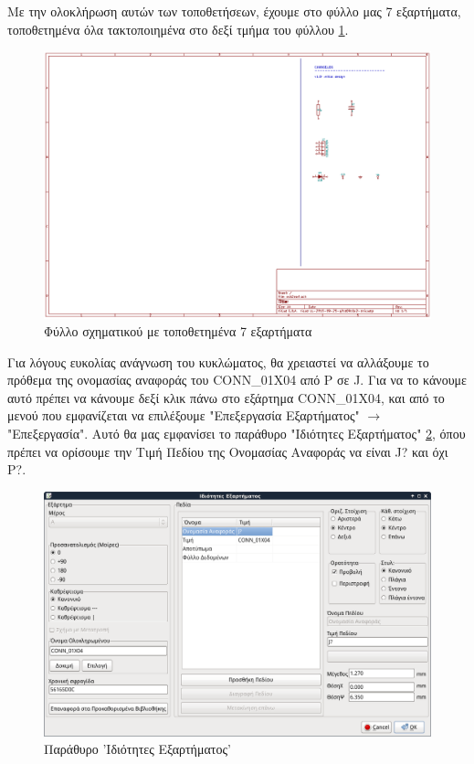 \documentclass[a4paper]{article}
\begin{document}
Με την ολοκλήρωση αυτών των τοποθετήσεων, έχουμε στο φύλλο μας 7 εξαρτήματα, τοποθετημένα όλα τακτοποιημένα στο δεξί τμήμα του φύλλου \ref{fig:eesch-circ-placedccomp}.

\begin{figure}
  \begin{center}
    \includegraphics[width=.9\textwidth]{img/eesch-circ-placedccomp.png}
    \caption{Φύλλο σχηματικού με τοποθετημένα 7 εξαρτήματα}
    \label{fig:eesch-circ-placedccomp}
  \end{center}
\end{figure}

Για λόγους ευκολίας ανάγνωση του κυκλώματος, θα χρειαστεί να αλλάξουμε το πρόθεμα της ονομασίας αναφοράς του CONN\_01X04 από P σε J. Για να το κάνουμε αυτό πρέπει να κάνουμε δεξί κλικ πάνω στο εξάρτημα CONN\_01X04, και από το μενού που εμφανίζεται να επιλέξουμε "Επεξεργασία Εξαρτήματος" $\rightarrow$ "Επεξεργασία". Αυτό θα μας εμφανίσει το παράθυρο "Ιδιότητες Εξαρτήματος" \ref{fig:eeasch-dial-compprop}, όπου πρέπει να ορίσουμε την Τιμή Πεδίου της Ονομασίας Αναφοράς να είναι J? και όχι P?.

\begin{figure}
  \begin{center}
    \includegraphics[width=.9\textwidth]{img/eeasch-dial-compprop.png}
    \caption{Παράθυρο 'Ιδιότητες Εξαρτήματος'}
    \label{fig:eeasch-dial-compprop}
  \end{center}
\end{figure}
\end{document}
